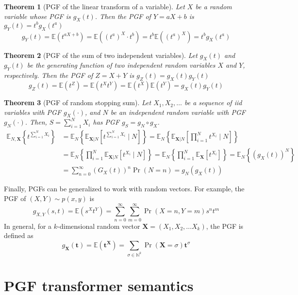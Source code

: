 \documentclass[a4paper]{article}
\newcommand{\E}{ \mathbb{E} }
\newtheorem{theorem}{Theorem}[section]
\begin{document}
\begin{theorem}[PGF of the linear transform of a variable]
	Let \(X\) be a random variable whose PGF is \(g_X(t)\).
	Then the PGF of \(Y=aX+b\) is \(g_Y(t) = t^b g_X(t^a)\)
	\[
		g_Y(t)
		= \E(t^{aX+b})
		= \E({(t^a)}^X \cdot t^b)
		= t^b \E({(t^a)}^X )
		= t^b g_X(t^a)
	\]
\end{theorem}
\begin{theorem}[PGF of the sum of two independent variables]
	Let \(g_X(t)\) and \(g_Y(t)\) be the generating function of two independent random variables \(X\) and \(Y\), respectively. Then the PGF of \(Z=X+Y\) is \(g_Z(t) = g_X(t)g_Y(t)\)
	\[
		g_Z(t) = \E(t^Z) = \E(t^X t^Y) = \E(t^X) \E(t^Y) = g_X(t) g_Y(t)
	\]
\end{theorem}
\begin{theorem}[PGF of random stopping sum]
	Let \(X_1, X_2, \ldots\) be a sequence of iid variables with PGF \(g_X(\cdot)\),
	and \(N\) be an independent random variable with PGF \(g_N(\cdot)\).
	Then, \(S=\sum_{i=1}^{N} X_i\) has PGF \(g_S = g_N\circ g_X\).
	\begin{align*}
		\E_{N,\mathbf{X}}\left\{ t^{\sum_{i=1}^N X_i} \right\}
		 & = \E_N\left\{ \E_{\mathbf{X}|N}\left[ t^{\sum_{i=1}^N X_i} \mid N \right] \right\}
		= \E_N\left\{ \E_{\mathbf{X}|N}\left[ \prod_{i=1}^N t^{X_i} \mid N \right] \right\}     \\
		 & = \E_N\left\{ \prod_{i=1}^N \E_{\mathbf{X}|N}\left[  t^{X_i} \mid N \right] \right\}
		= \E_N\left\{ \prod_{i=1}^N \E_{\mathbf{X}}\left[  t^{X_i} \right] \right\}
		= \E_N\left\{ {(g_X(t))}^N \right\}                                                     \\
		 & = \sum_{n=0}^{\infty} {(G_X(t))}^n \Pr(N=n)
		= g_N(g_X(t))
	\end{align*}
\end{theorem}

Finally, PGFs can be generalized to work with random vectors.
For example, the PGF of \((X,Y)\sim p(x,y)\) is
\[
	g_{X,Y}(s,t) = \E(s^X t^Y) = \sum_{n=0}^\infty \sum_{m=0}^\infty \Pr(X=n,Y=m) s^n t^m
\]
In general, for a \(k\)-dimensional random vector \(\mathbf{X}=(X_1,X_2,\ldots X_k)\), the PGF is defined as
\[
	g_{\mathbf{X}}(\mathbf{t}) = \E(\mathbf{t}^\mathbf{X}) = \sum_{\sigma\in\mathbb{N}^k} \Pr(\mathbf{X}=\sigma) \mathbf{t}^\sigma
\]

\section{PGF transformer semantics}
\end{document}

